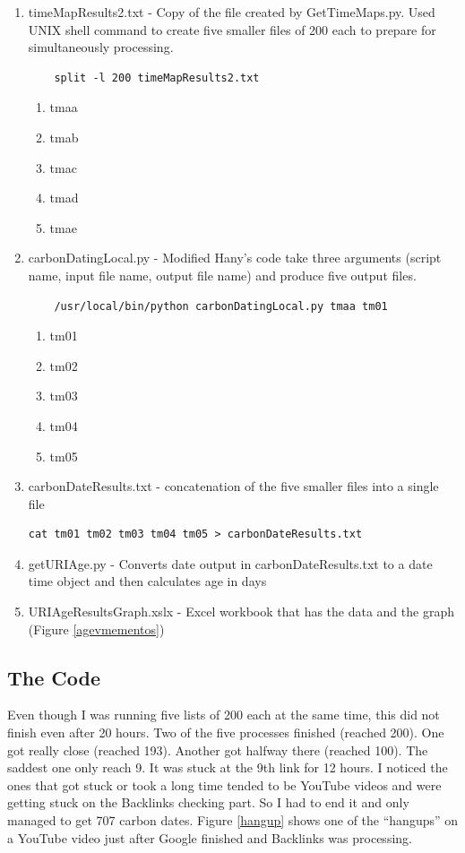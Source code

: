 \documentclass{article}
\begin{document}
\begin{enumerate}
\item timeMapResults2.txt - Copy of the file created by GetTimeMaps.py. Used UNIX shell command to create five smaller files of 200 each to prepare for simultaneously processing.
	\begin{verbatim}
	split -l 200 timeMapResults2.txt
	\end{verbatim}
	\begin{enumerate}
		\item tmaa
		\item tmab
		\item tmac
		\item tmad
		\item tmae
	\end{enumerate}
\item carbonDatingLocal.py - Modified Hany's code take three arguments (script name, input file name, output file name) and produce five output files.
	\begin{verbatim}
	/usr/local/bin/python carbonDatingLocal.py tmaa tm01
	\end{verbatim}
	\begin{enumerate}
		\item tm01
		\item tm02
		\item tm03
		\item tm04
		\item tm05
	\end{enumerate}
\item carbonDateResults.txt - concatenation of the five smaller files into a single file
\begin{verbatim}
cat tm01 tm02 tm03 tm04 tm05 > carbonDateResults.txt
\end{verbatim}
\item getURIAge.py - Converts date output in carbonDateResults.txt to a date time object and then calculates age in days
\item URIAgeResultsGraph.xslx - Excel workbook that has the data and the graph (Figure \ref{agevmementos})
\end{enumerate}

\subsection*{The Code}
Even though I was running five lists of 200 each at the same time, this did not finish even after 20 hours. Two of the five processes finished (reached 200). One got really close (reached 193). Another got halfway there (reached 100). The saddest one only reach 9. It was stuck at the 9th link for 12 hours. I noticed the ones that got stuck or took a long time tended to be YouTube videos and were getting stuck on the Backlinks checking part. So I had to end it and only managed to get 707 carbon dates. Figure \ref{hangup} shows one of the ``hangups'' on a YouTube video just after Google finished and Backlinks was processing.
\end{document}
